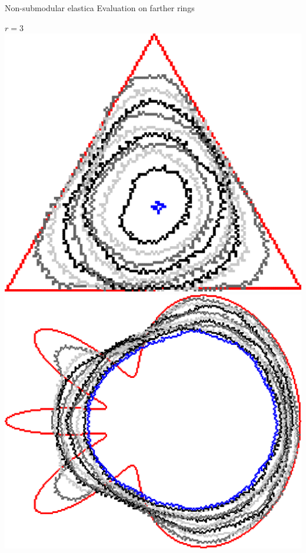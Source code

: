 \begin{frame}
{Non-submodular elastica}
{Evaluation on farther rings}

\begin{minipage}{0.49\textwidth}
\center
$r=3$\\
\includegraphics[scale=0.2]{figures/non-submodular-elastica/radius-effect/triangle-r3.png}\\[1em]
\includegraphics[scale=0.2]{figures/non-submodular-elastica/radius-effect/flower-r3.png}

\end{minipage}
\end{frame}
